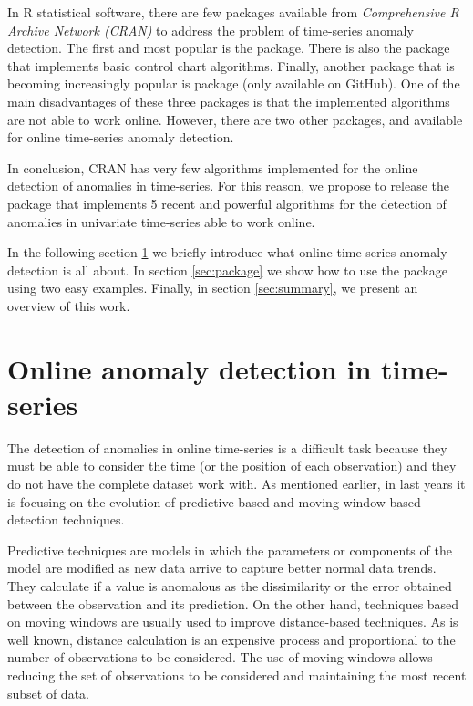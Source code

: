 \documentclass[a4paper]{article}\usepackage[]{graphicx}\usepackage[]{color}
\begin{document}
In R statistical software, there are few packages available from \emph{Comprehensive R Archive Network (CRAN)} to address the problem of time-series anomaly detection. The first and most popular is the  package. There is also the  package that implements basic control chart algorithms. Finally, another package that is becoming increasingly popular is  package (only available on GitHub). One of the main disadvantages of these three packages is that the implemented algorithms are not able to work online. However, there are two other packages,  and  available for online time-series anomaly detection.

In conclusion, CRAN has very few algorithms implemented for the online detection of anomalies in time-series. For this reason, we propose to release the  package that implements 5 recent and powerful algorithms for the detection of anomalies in univariate time-series able to work online.

In the following section \ref{sec:online} we briefly introduce what online time-series anomaly detection is all about. In section \ref{sec:package} we show how to use the  package using two easy examples. Finally, in section \ref{sec:summary}, we present an overview of this work.

\section{Online anomaly detection in time-series}\label{sec:online}

The detection of anomalies in online time-series is a difficult task because they must be able to consider the time (or the position of each observation) and they do not have the complete dataset work with. As mentioned earlier, in last years it is focusing on the evolution of predictive-based and moving window-based detection techniques.

Predictive techniques are models in which the parameters or components of the model are modified as new data arrive to capture better normal data trends. They calculate if a value is anomalous as the dissimilarity or the error obtained between the observation and its prediction. On the other hand, techniques based on moving windows are usually used to improve distance-based techniques. As is well known, distance calculation is an expensive process and proportional to the number of observations to be considered. The use of moving windows allows reducing the set of observations to be considered and maintaining the most recent subset of data.
\end{document}
